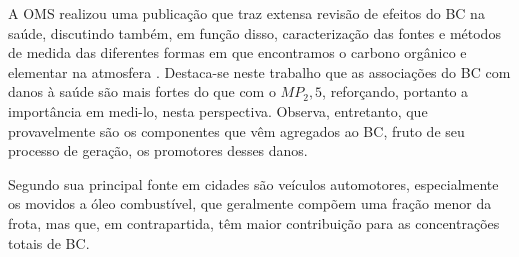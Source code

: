 A OMS realizou uma publicação que traz extensa revisão 
de efeitos do BC na saúde, discutindo também, em função disso, caracterização 
das fontes e métodos de medida das diferentes formas em que encontramos o 
carbono orgânico e elementar na atmosfera \citep{janssen2012}.
Destaca-se neste trabalho que as associações do BC com danos à saúde são mais 
fortes do que com o $MP_2,5$, reforçando, portanto a importância em medi-lo, 
nesta perspectiva. Observa, entretanto, que provavelmente são os componentes que
vêm agregados ao BC, fruto de seu processo de geração, os promotores desses 
danos.

Segundo \citet{petzold2013} sua principal fonte em cidades são veículos 
automotores, especialmente os movidos a óleo combustível, que geralmente compõem
uma fração menor da frota, mas que, em contrapartida, têm maior 
contribuição para as concentrações totais de BC.
